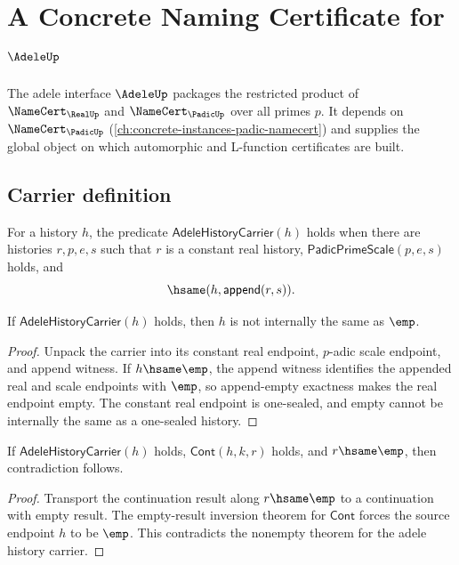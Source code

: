 \chapter{A Concrete Naming Certificate for $\AdeleUp$}
\label{ch:concrete-instances-adele-namecert}

The adele interface $\AdeleUp$ packages the restricted product of $\NameCert_{\RealUp}$ and $\NameCert_{\PadicUp}$ over all primes $p$. It depends on $\NameCert_{\PadicUp}$ (\autoref{ch:concrete-instances-padic-namecert}) and supplies the global object on which automorphic and L-function certificates are built.

\section{Carrier definition}
\label{sec:adele-carrier}

\begin{definition}
\label{def:adele-history-carrier}
For a history $h$, the predicate $\mathsf{AdeleHistoryCarrier}(h)$ holds when
there are histories $r,p,e,s$ such that $r$ is a constant real history,
$\mathsf{PadicPrimeScale}(p,e,s)$ holds, and
$$
\hsame(h,\mathsf{append}(r,s)).
$$
\end{definition}

\begin{theorem}
\label{thm:adele-history-carrier-not-empty}
If $\mathsf{AdeleHistoryCarrier}(h)$ holds, then $h$ is not internally the same
as $\emp$.
\end{theorem}
\begin{proof}
Unpack the carrier into its constant real endpoint, $p$-adic scale endpoint,
and append witness. If $h\hsame\emp$, the append witness identifies the
appended real and scale endpoints with $\emp$, so append-empty exactness makes
the real endpoint empty. The constant real endpoint is one-sealed, and empty
cannot be internally the same as a one-sealed history.
\end{proof}

\begin{theorem}
\label{thm:adele-history-carrier-cont-result-nonempty}
If $\mathsf{AdeleHistoryCarrier}(h)$ holds, $\mathsf{Cont}(h,k,r)$ holds, and
$r\hsame\emp$, then contradiction follows.
\end{theorem}
\begin{proof}
Transport the continuation result along $r\hsame\emp$ to a continuation with
empty result. The empty-result inversion theorem for $\mathsf{Cont}$ forces
the source endpoint $h$ to be $\emp$. This contradicts the nonempty theorem
for the adele history carrier.
\end{proof}

